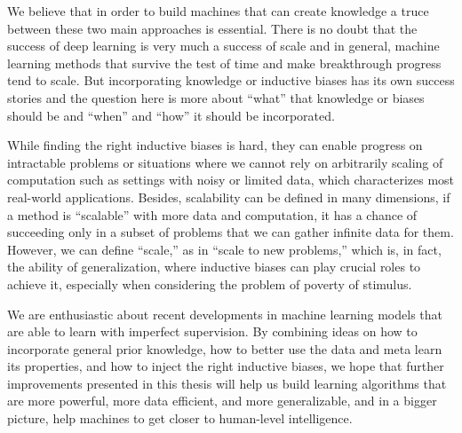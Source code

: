 We believe that in order to build machines that can create knowledge a truce between these two main approaches is essential.
There is no doubt that the success of deep learning is very much a success of scale and in general, machine learning methods that survive the test of time and make breakthrough progress tend to scale.
But incorporating knowledge or inductive biases has its own success stories and the question here is more about ``what'' that knowledge or biases should be and ``when'' and ``how'' it should be incorporated. 

While finding the right inductive biases is hard, they can enable progress on intractable problems or situations where we cannot rely on arbitrarily scaling of computation such as settings with noisy or limited data, which characterizes most real-world applications. 
Besides, scalability can be defined in many dimensions, if a method is ``scalable'' with more data and computation, it has a chance of succeeding only in a subset of problems that we can gather infinite data for them. 
However, we can define ``scale,'' as in ``scale to new problems,'' which is, in fact, the ability of generalization, where inductive biases can play crucial roles to achieve it, especially when considering the problem of poverty of stimulus.


\bigskip
We are enthusiastic about recent developments in machine learning models that are able to learn with imperfect supervision. 
By combining ideas on how to incorporate general prior knowledge, how to better use the data and meta learn its properties, and how to inject the right inductive biases, we hope that further improvements presented in this thesis will help us build learning algorithms that are more powerful, more data efficient, and more generalizable, and in a bigger picture, help machines to get closer to human-level intelligence. 

